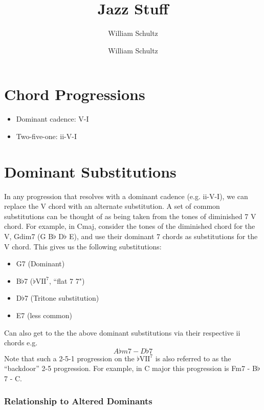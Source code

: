 \documentclass[10pt,a4paper]{article}
\author{William Schultz}
\begin{document}
\title{Jazz Stuff}
\author{William Schultz}
\maketitle

\section{Chord Progressions}
\begin{itemize}
    \item Dominant cadence: V-I
    \item Two-five-one: ii-V-I
\end{itemize}

\section{Dominant Substitutions}

In any progression that resolves with a dominant cadence (e.g. ii-V-I), we can replace the V chord with an alternate substitution. A set of common substitutions can be thought of as being taken from the tones of diminished 7 V chord. For example, in Cmaj, consider the tones of the diminished chord for the V, Gdim7 (G B$\flat$ D$\flat$ E), and use their dominant 7 chords as substitutions for the V chord. This gives us the following substitutions: 
\begin{itemize}
    \item G7 (Dominant)
    \item B$\flat$7 ($\flat\text{VII}^7$, ``flat 7 7")
    \item D$\flat$7 (Tritone substitution)
    \item E7 (less common)
\end{itemize}
Can also get to the the above dominant substitutions via their respective ii chords e.g. $$A \flat m7 - D \flat 7$$ Note that such a 2-5-1 progression on the $\flat\text{VII}^7$ is also referred to as the ``backdoor'' 2-5 progression. For example, in C major this progression is Fm7 - B$\flat$7 - C.

\subsubsection*{Relationship to Altered Dominants}
\end{document}
